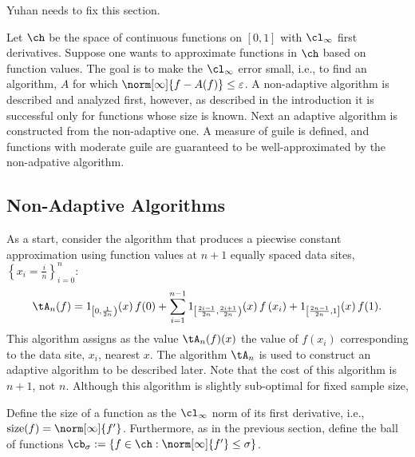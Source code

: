 Yuhan needs to fix this section.

Let $\ch$ be the space of continuous functions on $[0,1]$ with $\cl_{\infty}$ first derivatives.  Suppose one wants to approximate functions in $\ch$ based on function values.  The goal is to make the $\cl_{\infty}$ error small, i.e., to find an algorithm, $A$ for which $\norm[\infty]{f - A(f)} \le \varepsilon$.  A non-adaptive algorithm is described and analyzed first, however, as described in the introduction it is successful only for functions whose size is known.  Next an adaptive algorithm is constructed from the non-adaptive one.  A measure of guile is defined, and functions with moderate guile are guaranteed to be well-approximated by the non-adpative algorithm.

\subsection{Non-Adaptive Algorithms} As a start, consider the algorithm that produces a piecwise constant approximation using function values at $n+1$ equally spaced data sites, $\left\{x_i = \frac{i}{n}\right\}_{i=0}^n$:
\begin{equation} \label{appxbuildblock}
\tA_n(f) = 1_{\left[0,\frac{1}{2n}\right)}(x) \, f(0) + \sum_{i=1}^{n-1} 1_{\left[\frac{2i-1}{2n},\frac{2i+1}{2n}\right)}(x) \, f\left(x_i\right) + 1_{\left[\frac{2n-1}{2n},1\right]}(x) \, f(1).
\end{equation}
This algorithm assigns as the value $\tA_n(f)(x)$ the value of $f\left(x_i\right)$ corresponding to the data site, $x_i$, nearest $x$.  The algorithm $\tA_n$ is used to construct an adaptive algorithm to be described later.  Note that the cost of this algorithm is $n+1$, not $n$.  Although this algorithm is slightly sub-optimal for fixed sample size, 

Define the size of a function as the $\cl_{\infty}$ norm of its first derivative, i.e., $\size(f) = \norm[\infty]{f'}$. Furthermore, as in the previous section, define the ball of functions $\cb_{\sigma} :=\{f \in \ch : \norm[\infty]{f'} \le \sigma\}$.

